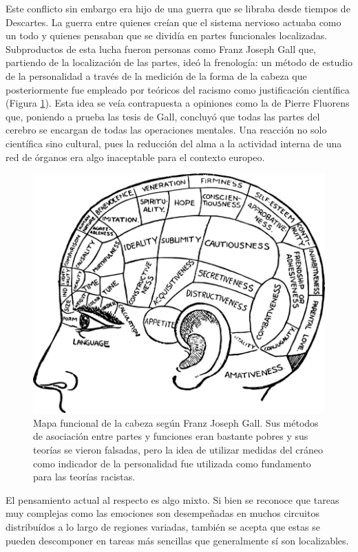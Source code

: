 Este conflicto sin embargo era hijo de una guerra que se libraba desde tiempos de Descartes. La guerra entre quienes creían que el sistema nervioso actuaba como un todo y quienes pensaban que se dividía en partes funcionales localizadas. Subproductos de esta lucha fueron personas como Franz Joseph Gall que, partiendo de la localización de las partes, ideó la frenología: un método de estudio de la personalidad a través de la medición de la forma de la cabeza que posteriormente fue empleado por teóricos del racismo como justificación científica (Figura \ref{gall}). Esta idea se veía contrapuesta a opiniones como la de Pierre Fluorens que, poniendo a prueba las tesis de Gall, concluyó que todas las partes del cerebro se encargan de todas las operaciones mentales. Una reacción no solo científica sino cultural, pues la reducción del alma a la actividad interna de una red de órganos era algo inaceptable para el contexto europeo.

\begin{figure}[H]
	\centering

	\includegraphics[width=\linewidth]{media/4-gall.png}
	\caption{Mapa funcional de la cabeza según Franz Joseph Gall. Sus métodos de asociación entre partes y funciones eran bastante pobres y sus teorías se vieron falsadas, pero la idea de utilizar medidas del cráneo como indicador de la personalidad fue utilizada como fundamento para las teorías racistas.}
	\label{gall}
\end{figure}

El pensamiento actual al respecto es algo mixto. Si bien se reconoce que tareas muy complejas como las emociones son desempeñadas en muchos circuitos distribuídos a lo largo de regiones variadas, también se acepta que estas se pueden descomponer en tareas más sencillas que generalmente sí son localizables.

